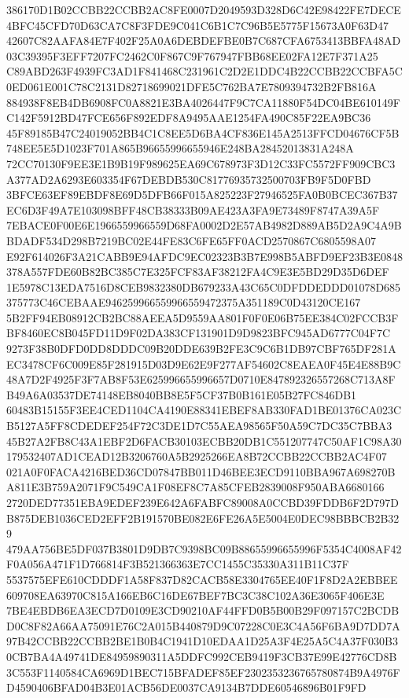 \documentclass[UTF8,fontset=fandol,zihao=-4,a4paper]{ctexart}
\begin{document}
{{386170D1B02CCBB22CCBB2AC8FE0007D2049593D328D6C42E98422FE7DECE4BFC45CFD70D63CA7C8F3FDE9C041C6B1C7C96B5E5775F15673A0F63D47
42607C82AAFA84E7F402F25A0A6DEBDEFBE0B7C687CFA6753413BBFA48AD03C39395F3EFF7207FC2462C0F867C9F767947FBB68EE02FA12E7F371A25
C89ABD263F4939FC3AD1F841468C231961C2D2E1DDC4B22CCBB22CCBFA5C0ED061E001C78C2131D82718699021DFE5C762BA7E7809394732B2FB816A
884938F8EB4DB6908FC0A8821E3BA4026447F9C7CA11880F54DC04BE610149FC142F5912BD47FCE656F892EDF8A9495AAE1254FA490C85F22EA9BC36
45F89185B47C24019052BB4C1C8EE5D6BA4CF836E145A2513FFCD04676CF5B748EE5E5D1023F701A865B96655996655946E248BA28452013831A248A
72CC70130F9EE3E1B9B19F989625EA69C678973F3D12C33FC5572FF909CBC3A377AD2A6293E603354F67DEBDB530C81776935732500703FB9F5D0FBD
3BFCE63EF89EBDF8E69D5DFB66F015A825223F27946525FA0B0BCEC367B37EC6D3F49A7E103098BFF48CB38333B09AE423A3FA9E73489F8747A39A5F
7EBACE0F00E6E1966559966559D68FA0002D2E57AB4982D889AB5D2A9C4A9BBDADF534D298B7219BC02E44FE83C6FE65FF0ACD2570867C6805598A07
E92F614026F3A21CABB9E94AFDC9EC02323B3B7E998B5ABFD9EF23B3E0848378A557FDE60B82BC385C7E325FCF83AF38212FA4C9E3E5BD29D35D6DEF
1E5978C13EDA7516D8CEB9832380DB679233A43C65C0DFDDEDDD01078D685375773C46CEBAAE946259966559966559472375A351189C0D43120CE167
5B2FF94EB08912CB2BC88AEEA5D9559AA801F0F0E06B75EE384C02FCCB3FBF8460EC8B045FD11D9F02DA383CF131901D9D9823BFC945AD6777C04F7C
9273F38B0DFD0DD8DDDC09B20DDE639B2FE3C9C6B1DB97CBF765DF281AEC3478CF6C009E85F281915D03D9E62E9F277AF54602C8EAEA0F45E4E88B9C
48A7D2F4925F3F7AB8F53E625996655996657D0710E847892326557268C713A8FB49A6A03537DE74148EB8040BB8E5F5CF37B0B161E05B27FC846DB1
60483B15155F3EE4CED1104CA4190E88341EBEF8AB330FAD1BE01376CA023CB5127A5FF8CDEDEF254F72C3DE1D7C55AEA98565F50A59C7DC35C7BBA3
45B27A2FB8C43A1EBF2D6FACB30103ECBB20DB1C551207747C50AF1C98A30179532407AD1CEAD12B3206760A5B2925266EA8B72CCBB22CCBB2AC4F07
021A0F0FACA4216BED36CD07847BB011D46BEE3ECD9110BBA967A698270BA811E3B759A2071F9C549CA1F08EF8C7A85CFEB2839008F950ABA6680166
2720DED77351EBA9EDEF239E642A6FABFC89008A0CCBD39FDDB6F2D797DB875DEB1036CED2EFF2B191570BE082E6FE26A5E5004E0DEC98BBBCB2B329
479AA756BE5DF037B3801D9DB7C9398BC09B88655996655996F5354C4008AF42F0A056A471F1D766814F3B521366363E7CC1455C35330A311B11C37F
5537575EFE610CDDDF1A58F837D82CACB58E3304765EE40F1F8D2A2EBBEE609708EA63970C815A166EB6C16DE67BEF7BC3C38C102A36E3065F406E3E
7BE4EBDB6EA3ECD7D0109E3CD90210AF44FFD0B5B00B29F097157C2BCDBD0C8F82A66AA75091E76C2A015B440879D9C07228C0E3C4A56F6BA9D7DD7A
97B42CCBB22CCBB2BE1B0B4C1941D10EDAA1D25A3F4E25A5C4A37F030B30CB7BA4A49741DE84959890311A5DDFC992CEB9419F3CB37E99E42776CD8B
3C553F1140584CA6969D1BEC715BFADEF85EF2302353236765780874B9A4976FD4590406BFAD04B3E01ACB56DE0037CA9134B7DDE60546896B01F9FD
}}
\end{document}
